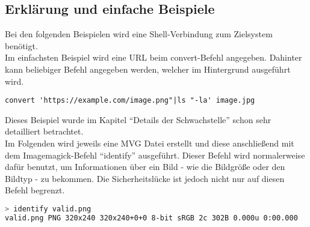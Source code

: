 \subsection{Erklärung und einfache Beispiele}\label{subsec:erklaerung-und-einfache-beispiele}

Bei den folgenden Beispielen wird eine Shell-Verbindung zum Zielsystem benötigt.\\

Im einfachsten Beispiel wird eine URL beim convert-Befehl angegeben.
Dahinter kann beliebiger Befehl angegeben werden, welcher im Hintergrund ausgeführt wird.
\begin{lstlisting}[language=Text, caption=convert-Befehl mit URL als einfachstes Beispiel,label={lst:einfachstesbeispiel}]
convert 'https://example.com/image.png"|ls "-la' image.jpg
\end{lstlisting}
\vspace{5mm}

Dieses Beispiel wurde im Kapitel "`Details der Schwachstelle"' schon sehr detailliert betrachtet.\\

Im Folgenden wird jeweils eine MVG Datei erstellt und diese anschließend mit dem Imagemagick-Befehl "`identify"' ausgeführt.
Dieser Befehl wird normalerweise dafür benutzt,
um Informationen über ein Bild - wie die Bildgröße oder den Bildtyp - zu bekommen.
Die Sicherheitslücke ist jedoch nicht nur auf diesen Befehl begrenzt.\\

\begin{lstlisting}[language=Bash, caption=Erklaerung - Identify einer validen PNG Datei,label={lst:lstlisting}]
> identify valid.png
valid.png PNG 320x240 320x240+0+0 8-bit sRGB 2c 302B 0.000u 0:00.000
\end{lstlisting}

